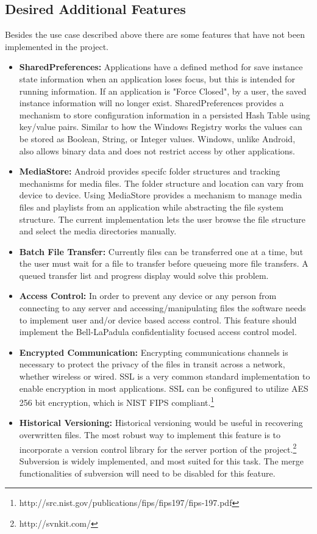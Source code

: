 \documentclass[12pt]{article}
\begin{document}
\subsection{Desired Additional Features}
Besides the use case described above there are some features that have not been implemented in the project.
\begin{itemize}
\item \textbf{SharedPreferences:} Applications have a defined method for save instance state information when an application loses focus, but this is intended for running information. If an application is "Force Closed", by a user, the saved instance information will no longer exist. SharedPreferences provides a mechanism to store configuration information in a persisted Hash Table using key/value pairs. Similar to how the Windows Registry works the values can be stored as Boolean, String, or Integer values. Windows, unlike Android, also allows binary data and does not restrict access by other applications. 
\item \textbf{MediaStore:} Android provides specifc folder structures and tracking mechanisms for media files. The folder structure and location can vary from device to device. Using MediaStore provides a mechanism to manage media files and playlists from an application while abstracting the file system structure. The current implementation lets the user browse the file structure and select the media directories manually.

\item \textbf{Batch File Transfer:} Currently files can be transferred one at a time, but the user must wait for a file to transfer before queueing more file transfers. A queued transfer list and progress display would solve this problem.
\item \textbf{Access Control:} In order to prevent any device or any person from connecting to any server and accessing/manipulating files the software needs to implement user and/or device based access control. This feature should implement the Bell-LaPadula confidentiality focused access control model.
\item \textbf{Encrypted Communication:} Encrypting communications channels is necessary to protect the privacy of the files in transit across a network, whether wireless or wired. SSL is a very common standard implementation to enable encryption in most applications. SSL can be configured to utilize AES 256 bit encryption, which is NIST FIPS compliant.\footnote{http://src.nist.gov/publications/fips/fips197/fips-197.pdf}

\item \textbf{Historical Versioning:} Historical versioning would be useful in recovering overwritten files.  The most robust way to implement this feature is to incorporate a version control library for the server portion of the project.\footnote{http://svnkit.com/} Subversion is widely implemented, and most suited for this task. The merge functionalities of subversion will need to be disabled for this feature.
\end{itemize}
\end{document}
